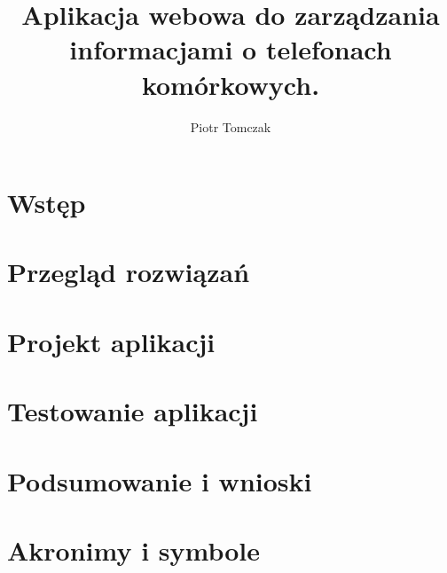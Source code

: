 \documentclass[a4paper,12pt,twoside]{extreport}
\title{Aplikacja webowa do zarządzania informacjami o telefonach komórkowych.}
\author{Piotr Tomczak}
\begin{document}


\thispagestyle{plain}

% 

% 

\tableofcontents
{}

\chapter{Wstęp}


\chapter{Przegląd rozwiązań}


\chapter{Projekt aplikacji}


\chapter{Testowanie aplikacji}


\chapter{Podsumowanie i wnioski}


\printbibliography[heading=bibintoc, title=Bibliografia]

\newpage
\listoffigures

\newpage
\listofcodes

\newpage
\listoftables

\appendix
\chapter{Akronimy i symbole}

\end{document}
